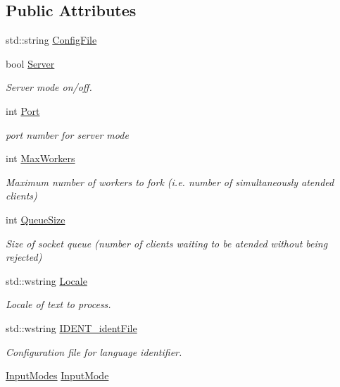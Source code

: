 \subsection*{Public Attributes}
\begin{DoxyCompactItemize}
\item 
std\+::string \hyperlink{classconfig_a24ba112bf45f600af2f79352b1c26646}{Config\+File}
\item 
bool \hyperlink{classconfig_a8868de72bdafb627b21b7f20e16ebf9e}{Server}
\begin{DoxyCompactList}\small\item\em Server mode on/off. \end{DoxyCompactList}\item 
int \hyperlink{classconfig_a05e9c81408b74459038340658bcd3a20}{Port}
\begin{DoxyCompactList}\small\item\em port number for server mode \end{DoxyCompactList}\item 
int \hyperlink{classconfig_a8771443c351f1d07be7eccc02beb8fff}{Max\+Workers}
\begin{DoxyCompactList}\small\item\em Maximum number of workers to fork (i.\+e. number of simultaneously atended clients) \end{DoxyCompactList}\item 
int \hyperlink{classconfig_ab690d59ef9d289198d2676ddc6bd5772}{Queue\+Size}
\begin{DoxyCompactList}\small\item\em Size of socket queue (number of clients waiting to be atended without being rejected) \end{DoxyCompactList}\item 
std\+::wstring \hyperlink{classconfig_a850a92a12eacd1bfee3f917792463b3f}{Locale}
\begin{DoxyCompactList}\small\item\em Locale of text to process. \end{DoxyCompactList}\item 
std\+::wstring \hyperlink{classconfig_a66b67d42d16146ebcc7f7bc355c5b60c}{I\+D\+E\+N\+T\+\_\+ident\+File}
\begin{DoxyCompactList}\small\item\em Configuration file for language identifier. \end{DoxyCompactList}\item 
\hyperlink{config_8h_ad5cac7b85d200232841f3f0a31bea5c1}{Input\+Modes} \hyperlink{classconfig_a081f4b86bc4315514b3693da987da11f}{Input\+Mode}

\end{DoxyCompactItemize}
